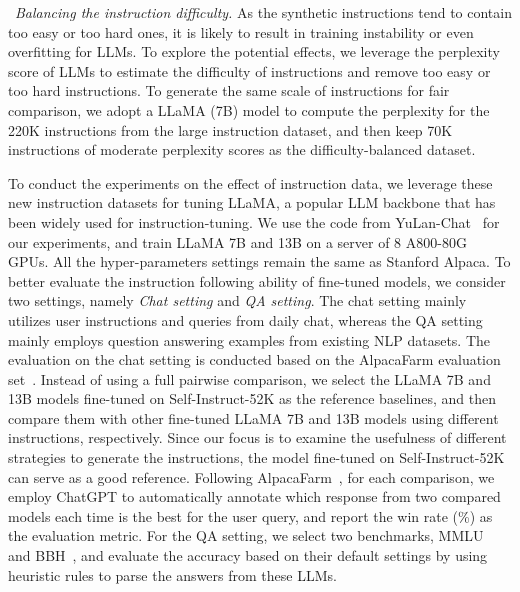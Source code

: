 \textbullet~\emph{Balancing the instruction difficulty.}
As the synthetic instructions tend to contain too easy or too hard ones, it is likely to result in training instability or even overfitting for LLMs. To explore the  potential effects, we leverage the perplexity score of LLMs to estimate the difficulty of instructions and remove  too easy or too hard instructions.  
To generate the same scale  of instructions for fair comparison, we adopt a LLaMA (7B) model to compute the perplexity for the 220K instructions from the large instruction dataset, and then keep 70K instructions of moderate perplexity scores as the difficulty-balanced dataset. 



To conduct the experiments on the effect of instruction data, we leverage these new instruction datasets for tuning LLaMA, a popular LLM backbone that has been widely used for instruction-tuning. 
We use the code from YuLan-Chat~\cite{YuLan-Chat} for our experiments,  and train LLaMA 7B and 13B on a server of 8 A800-80G GPUs. 
All the hyper-parameters settings remain the same as Stanford Alpaca.
To better evaluate the  {instruction following ability of fine-tuned models, we consider two settings, namely 
\emph{Chat setting} and \emph{QA setting}. 
 The chat setting mainly utilizes user instructions and queries from daily chat, whereas the QA setting mainly employs question answering examples from existing NLP datasets. }
The evaluation on the chat setting is conducted based on the AlpacaFarm evaluation set~\cite{Dubois-arxiv-2023-AlpacaFarm}. 
Instead of using a full pairwise comparison,  %
{we select the LLaMA 7B and 13B models fine-tuned on Self-Instruct-52K as the reference baselines, and then compare them with other fine-tuned LLaMA 7B and 13B models using different instructions, respectively.} Since our focus is to examine the usefulness of different strategies to generate the instructions, the model fine-tuned on Self-Instruct-52K can serve as a good reference.  
Following AlpacaFarm~\cite{Dubois-arxiv-2023-AlpacaFarm}, for each comparison,  we employ ChatGPT to automatically annotate which response from two compared models each time is the best for the user query, and report the win rate (\%) as the evaluation metric.
For the QA setting, we select two benchmarks, MMLU~\cite{Hendrycks-ICLR-2021-Measuring} and BBH~\cite{Suzgun-arxiv-2022-Challenging}, and evaluate the accuracy based on their default settings by using heuristic rules to parse the answers from these LLMs.


